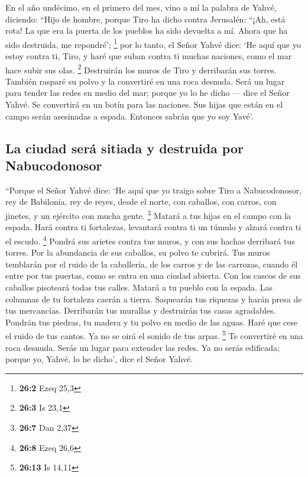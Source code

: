  En el año undécimo, en el primero del mes, vino a mí la
palabra de Yahvé, diciendo:  ``Hijo de hombre, porque Tiro
ha dicho contra Jerusalén: ``¡Ah, está rota! La que era la puerta de los
pueblos ha sido devuelta a mí. Ahora que ha sido destruida, me
repondré'; \footnote{\textbf{26:2} Ezeq 25,3}  por lo
tanto, el Señor Yahvé dice: `He aquí que yo estoy contra ti, Tiro, y
haré que suban contra ti muchas naciones, como el mar hace subir sus
olas. \footnote{\textbf{26:3} Is 23,1}  Destruirán los
muros de Tiro y derribarán sus torres. También rasparé su polvo y la
convertiré en una roca desnuda.  Será un lugar para tender
las redes en medio del mar; porque yo lo he dicho --- dice el Señor
Yahvé. Se convertirá en un botín para las naciones.  Sus
hijas que están en el campo serán asesinadas a espada. Entonces sabrán
que yo soy Yavé'.

\hypertarget{la-ciudad-seruxe1-sitiada-y-destruida-por-nabucodonosor}{%
\subsection{La ciudad será sitiada y destruida por
Nabucodonosor}\label{la-ciudad-seruxe1-sitiada-y-destruida-por-nabucodonosor}}

 ``Porque el Señor Yahvé dice: `He aquí que yo traigo
sobre Tiro a Nabucodonosor, rey de Babilonia, rey de reyes, desde el
norte, con caballos, con carros, con jinetes, y un ejército con mucha
gente. \footnote{\textbf{26:7} Dan 2,37}  Matará a tus
hijas en el campo con la espada. Hará contra ti fortalezas, levantará
contra ti un túmulo y alzará contra ti el escudo. \footnote{\textbf{26:8}
  Ezeq 26,6}  Pondrá sus arietes contra tus muros, y con
sus hachas derribará tus torres.  Por la abundancia de
sus caballos, su polvo te cubrirá. Tus muros temblarán por el ruido de
la caballería, de los carros y de las carrozas, cuando él entre por tus
puertas, como se entra en una ciudad abierta.  Con los
cascos de sus caballos pisoteará todas tus calles. Matará a tu pueblo
con la espada. Las columnas de tu fortaleza caerán a tierra.
 Saquearán tus riquezas y harán presa de tus mercancías.
Derribarán tus murallas y destruirán tus casas agradables. Pondrán tus
piedras, tu madera y tu polvo en medio de las aguas. 
Haré que cese el ruido de tus cantos. Ya no se oirá el sonido de tus
arpas. \footnote{\textbf{26:13} Is 14,11}  Te convertiré
en una roca desnuda. Serás un lugar para extender las redes. Ya no serás
edificada; porque yo, Yahvé, lo he dicho', dice el Señor Yahvé.

